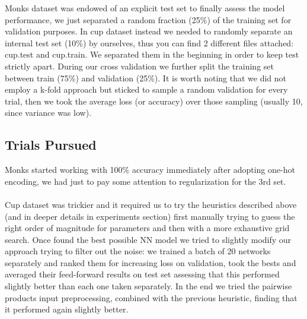 Monks dataset was endowed of an explicit test set to finally assess the model performance, we just separated a random fraction (25\%) of the training set for validation purposes. In cup dataset instead we needed to randomly separate an internal test set (10\%) by ourselves, thus you can find 2 different files attached: cup.test and cup.train. We separated them in the beginning in order to keep test strictly apart. During our cross validation we further split the training set between train (75\%) and validation (25\%). It is worth noting that we did not employ a k-fold approach but sticked to sample a random validation for every trial, then we took the average loss (or accuracy) over those sampling (usually 10, since variance was low).

\subsection{Trials Pursued}

Monks started working with 100\% accuracy immediately after adopting one-hot encoding, we had just to pay some attention to regularization for the 3rd set.

\paragraph{}
Cup dataset was trickier and it required us to try the heuristics described above (and in deeper details in experiments section) first manually trying to guess the right order of magnitude for parameters and then with a more exhaustive grid search. Once found the best possible NN model we tried to slightly modify our approach trying to filter out the noise: we trained a batch of 20 networks separately and ranked them for increasing loss on validation, took the bests and averaged their feed-forward results on test set assessing that this performed slightly better than each one taken separately. In the end we tried the pairwise products input preprocessing, combined with the previous heuristic, finding that it performed again slightly better. 


